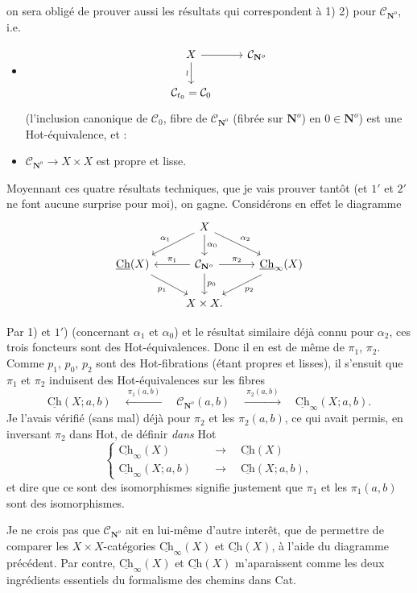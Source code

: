\documentclass[11pt]{article}
\newcommand{\printedpage}[1]{\marginpar{\footnotesize p.~#1}}
\newcommand{\msp}[1]{\marginpar{\footnotesize [#1]}}
\newcommand{\Ch}{\underline{\mathrm{Ch}}}
\newcommand{\cC}{\mathcal{C}}
\newcommand{\NN}{\mathbf{N}^{o}}
\begin{document}
\printedpage{99}
on sera obligé de prouver aussi les résultats qui correspondent à 1) 2) pour $\cC_{\NN}$, i.e.

\begin{itemize}[label={}]
\item[1$'$)]
\[
\begin{tikzcd}
X \ar[r] \ar[d,"\wr"'] & \cC_{\NN} \\
\cC_{t_0} = \cC_0 &
\end{tikzcd}
\]
(l'inclusion canonique de $\cC_0$, fibre de $\cC_{\NN}$ (fibrée sur $\mathbf{N}^o$) en $0 \in \mathbf{N}^o$) est une Hot-équivalence, et :

\item[2$'$)] $\cC_{\NN} \longrightarrow X \times X$ est propre et lisse.
\end{itemize}

Moyennant ces quatre résultats techniques, que je vais prouver tantôt (et $1'$ et $2'$ ne font aucune surprise pour moi), on gagne. Considérons en effet le diagramme
\[
\begin{tikzcd}
& X \ar[dl,"\alpha_1"'] \ar[d,"\alpha_0"] \ar[dr,"\alpha_2"] & \\
\Ch(X) \ar[dr,"p_1"'] & \cC_{\NN} \ar[l,"\pi_1"'] \ar[r,"\pi_2"] \ar[d,"p_0"] & \Ch_{\infty}(X) \ar[dl,"p_2"] \\
& X \times X. &
\end{tikzcd}
\]

Par 1) et $1'$) (concernant $\alpha_1$ et $\alpha_0$) et le résultat
\msp{page 159}
similaire déjà connu pour $\alpha_2$, ces trois foncteurs sont des Hot-équivalences. Donc il en est de même de $\pi_1$, $\pi_2$. Comme $p_1$, $p_0$, $p_2$ sont des Hot-fibrations (étant propres et lisses), il s'ensuit que $\pi_1$ et $\pi_2$ induisent des Hot-équivalences sur les fibres
\[
\Ch(X;a,b) \quad \xleftarrow{\ \pi_1(a,b)\ } \quad \cC_{\NN}(a,b) \quad \xrightarrow{\ \pi_2(a,b)\ } \quad \Ch_{\infty}(X;a,b).
\]
Je l'avais vérifié (sans mal) déjà pour $\pi_2$ et les $\pi_2(a,b)$, ce qui avait permis, en inversant $\pi_2$ dans Hot, de définir \textit{dans} Hot
\[
\left\{
\begin{aligned}
\Ch_{\infty}(X) &\quad\longrightarrow\quad \Ch(X) \\
\Ch_{\infty}(X;a,b) &\quad\longrightarrow\quad \Ch(X;a,b),
\end{aligned}
\right.
\]
et dire que ce sont des isomorphismes signifie justement que $\pi_1$ et les $\pi_1(a,b)$ sont des isomorphismes.

Je ne crois pas que $\cC_{\NN}$ ait en lui-même d'autre interêt, que de permettre de comparer %
les $X \times X$-catégories $\Ch_{\infty}(X)$ et $\Ch(X)$, à l'aide du diagramme précédent. Par contre, $\Ch_{\infty}(X)$ et $\Ch(X)$ m'aparaissent comme les deux ingrédients essentiels du formalisme des %
chemins dans Cat.
\end{document}
